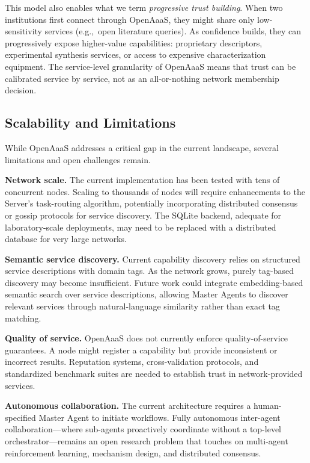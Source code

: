 \documentclass{article}
\begin{document}
This model also enables what we term \textit{progressive trust building}. When two institutions first connect through OpenAaaS, they might share only low-sensitivity services (e.g.,\ open literature queries). As confidence builds, they can progressively expose higher-value capabilities: proprietary descriptors, experimental synthesis services, or access to expensive characterization equipment. The service-level granularity of OpenAaaS means that trust can be calibrated service by service, not as an all-or-nothing network membership decision.

\subsection{Scalability and Limitations}

While OpenAaaS addresses a critical gap in the current landscape, several limitations and open challenges remain.

\textbf{Network scale.} The current implementation has been tested with tens of concurrent nodes. Scaling to thousands of nodes will require enhancements to the Server's task-routing algorithm, potentially incorporating distributed consensus or gossip protocols for service discovery. The SQLite backend, adequate for laboratory-scale deployments, may need to be replaced with a distributed database for very large networks.

\textbf{Semantic service discovery.} Current capability discovery relies on structured service descriptions with domain tags. As the network grows, purely tag-based discovery may become insufficient. Future work could integrate embedding-based semantic search over service descriptions, allowing Master Agents to discover relevant services through natural-language similarity rather than exact tag matching.

\textbf{Quality of service.} OpenAaaS does not currently enforce quality-of-service guarantees. A node might register a capability but provide inconsistent or incorrect results. Reputation systems, cross-validation protocols, and standardized benchmark suites are needed to establish trust in network-provided services.

\textbf{Autonomous collaboration.} The current architecture requires a human-specified Master Agent to initiate workflows. Fully autonomous inter-agent collaboration---where sub-agents proactively coordinate without a top-level orchestrator---remains an open research problem that touches on multi-agent reinforcement learning, mechanism design, and distributed consensus.
\end{document}
